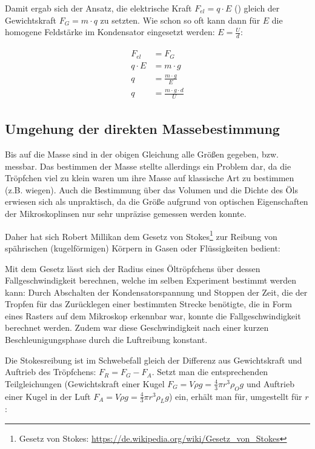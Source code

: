 Damit ergab sich der Ansatz, die elektrische Kraft $F_{el}=q \cdot E$ () gleich der Gewichtskraft $F_G = m \cdot q$ zu setzten. Wie schon so oft kann dann für $E$ die homogene Feldstärke im Kondensator eingesetzt werden: $E = \frac{U}{d}$:

\begin{align} \label{eq:MillikanAnsatz}
\begin{split}
	F_{el} &= F_G \\
	q \cdot E &= m \cdot g \\
	q &= \frac{m \cdot g}{E} \\
	q &= \frac{m \cdot g \cdot d}{U}
\end{split}
\end{align}


\subsection{Umgehung der direkten Massebestimmung}

Bis auf die Masse sind in der obigen Gleichung alle Größen gegeben, bzw. messbar. Das bestimmen der Masse stellte allerdings ein Problem dar, da die Tröpfchen viel zu klein waren um ihre Masse auf klassische Art zu bestimmen (z.B. wiegen). Auch die Bestimmung über das Volumen und die Dichte des Öls erwiesen sich als unpraktisch, da die Größe aufgrund von optischen Eigenschaften der Mikroskoplinsen nur sehr unpräzise gemessen werden konnte.

Daher hat sich Robert Millikan dem Gesetz von Stokes\footnote{Gesetz von Stokes: \url{https://de.wikipedia.org/wiki/Gesetz_von_Stokes}} zur Reibung von spährischen (\glqq kugelförmigen\grqq) Körpern in Gasen oder Flüssigkeiten bedient: 

Mit dem Gesetz lässt sich der Radius eines Öltröpfchens über dessen Fallgeschwindigkeit berechnen, welche im selben Experiment bestimmt werden kann: Durch Abschalten der Kondensatorspannung und Stoppen der Zeit, die der Tropfen für das Zurücklegen einer bestimmten Strecke benötigte, die in Form eines Rasters auf dem Mikroskop erkennbar war, konnte die Fallgeschwindigkeit berechnet werden. Zudem war diese Geschwindigkeit nach einer kurzen Beschleunigungsphase durch die Luftreibung konstant.

Die Stokesreibung ist im Schwebefall gleich der Differenz aus Gewichtskraft und Auftrieb des Tröpfchens: $F_R = F_G - F_A$. Setzt man die entsprechenden Teilgleichungen (Gewichtskraft einer Kugel $F_G = V \rho g = \frac{4}{3} \pi r^3 \rho_{O} g$ und Auftrieb einer Kugel in der Luft $F_A = V \rho g = \frac{4}{3} \pi r^3 \rho_L g$) ein, erhält man für, umgestellt für $r$:

